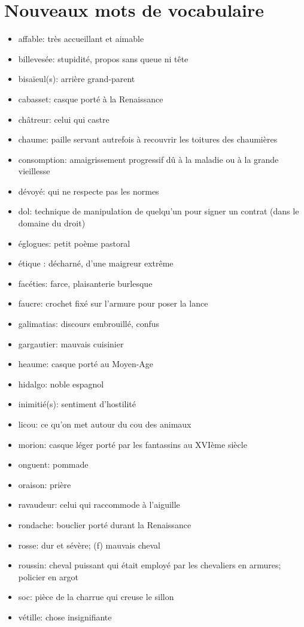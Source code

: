 \documentclass{article}
\begin{document}
\section{Nouveaux mots de vocabulaire}
\begin{itemize}
    \item affable: très accueillant et aimable
    \item billevesée: stupidité, propos sans queue ni tête
    \item bisaïeul(s): arrière grand-parent
    \item cabasset: casque porté à la Renaissance
    \item châtreur: celui qui castre
    \item chaume: paille servant autrefois à recouvrir les toitures des chaumières
    \item consomption: amaigrissement progressif dû à la maladie ou à la grande vieillesse
    \item dévoyé: qui ne respecte pas les normes
    \item dol: technique de manipulation de quelqu'un pour signer un contrat (dans le domaine du droit)
    \item églogues: petit poème pastoral
    \item étique : décharné, d'une maigreur extrême
    \item facéties: farce, plaisanterie burlesque
    \item faucre: crochet fixé sur l'armure pour poser la lance
    \item galimatias: discours embrouillé, confus
    \item gargautier: mauvais cuisinier
    \item heaume: casque porté au Moyen-Age
    \item hidalgo: noble espagnol
    \item inimitié(s): sentiment d'hostilité
    \item licou: ce qu'on met autour du cou des animaux
    \item morion: casque léger porté par les fantassins au XVIème siècle
    \item onguent: pommade
    \item oraison: prière
    \item ravaudeur: celui qui raccommode à l'aiguille
    \item rondache: bouclier porté durant la Renaissance
    \item rosse: dur et sévère; (f) mauvais cheval
    \item roussin: cheval puissant qui était employé par les chevaliers en armures; policier en argot
    \item soc: pièce de la charrue qui creuse le sillon
    \item vétille: chose insignifiante
\end{itemize}
\end{document}
